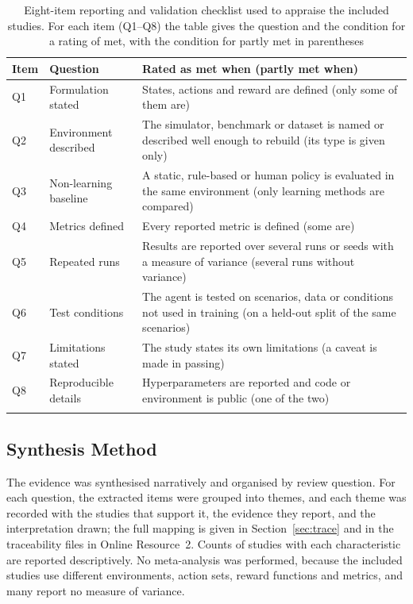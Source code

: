 \documentclass[pdflatex,sn-basic]{sn-jnl}
\begin{document}
\begin{table}[!htbp]
\caption{Eight-item reporting and validation checklist used to appraise the included studies. For each item (Q1--Q8) the table gives the question and the condition for a rating of met, with the condition for partly met in parentheses}\label{tab:checklist}
\footnotesize
\begin{tabularx}{\textwidth}{@{}lP{2.2cm}L@{}}
\toprule
Item & Question & Rated as met when (partly met when) \\
\midrule
Q1 & Formulation stated & States, actions and reward are defined (only some of them are) \\
Q2 & Environment described & The simulator, benchmark or dataset is named or described well enough to rebuild (its type is given only) \\
Q3 & Non-learning baseline & A static, rule-based or human policy is evaluated in the same environment (only learning methods are compared) \\
Q4 & Metrics defined & Every reported metric is defined (some are) \\
Q5 & Repeated runs & Results are reported over several runs or seeds with a measure of variance (several runs without variance) \\
Q6 & Test conditions & The agent is tested on scenarios, data or conditions not used in training (on a held-out split of the same scenarios) \\
Q7 & Limitations stated & The study states its own limitations (a caveat is made in passing) \\
Q8 & Reproducible details & Hyperparameters are reported and code or environment is public (one of the two) \\
\botrule
\end{tabularx}
\end{table}

\subsection{Synthesis Method}

The evidence was synthesised narratively and organised by review question. For each question, the extracted items were grouped into themes, and each theme was recorded with the studies that support it, the evidence they report, and the interpretation drawn; the full mapping is given in Section~\ref{sec:trace} and in the traceability files in Online Resource~2. Counts of studies with each characteristic are reported descriptively. No meta-analysis was performed, because the included studies use different environments, action sets, reward functions and metrics, and many report no measure of variance.
\end{document}
